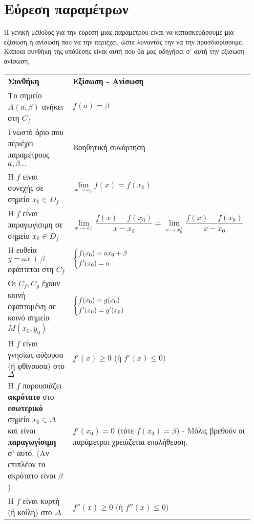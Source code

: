 \documentclass[ektypwsh]{frontisthrio}
\begin{document}
\section{Εύρεση παραμέτρων}
Η γενική μέθοδος για την εύρεση μιας παραμέτρου είναι να κατασκευάσουμε μια εξίσωση ή ανίσωση που να την περιέχει, ώστε λύνοντάς την να την προσδιορίσουμε. Κάποια συνθήκη της υπόθεσης είναι αυτή που θα μας οδηγήσει σ' αυτή την εξίσωση-ανίσωση. 
\begin{center}
\begin{tabular}{p{7.5cm}|p{7.5cm}}
\hline
\rule[-2ex]{0pt}{5.5ex} \textbf{Συνθήκη} & \textbf{Εξίσωση - Ανίσωση} \\
\hhline{==}
\rule[-2ex]{0pt}{5.5ex} Το σημείο $ A(a,\beta) $  ανήκει στη $ C_f $ & $ f(a)=\beta $ \\
\hline
\rule[-2ex]{0pt}{5.5ex} Γνωστό όριο που περιέχει παραμέτρους $ a,\beta\ldots $ & Βοηθητική συνάρτηση \\
\hline
\rule[-2ex]{0pt}{5.5ex} Η $ f $ είναι συνεχής σε σημείο $ x_0\in D_f $ & $ \lim\limits_{x\to x_0}f(x)=f(x_0) $ \\
\hline
\rule[-1ex]{0pt}{5.5ex} Η $ f $ είναι παραγωγίσιμη σε σημείο $ x_0\in D_f $ & $ \lim\limits_{x\to x_0^-}{\dfrac{f(x)-f(x_0)}{x-x_0}}=\lim\limits_{x\to x_0^+}{\dfrac{f(x)-f(x_0)}{x-x_0}} $ \\
\hline
\rule[0ex]{0pt}{5ex} Η ευθεία $ y=ax+\beta $ εφάπτεται στη $ C_f $ & $\begin{dcases}
f(x_0)=ax_0+\beta\\
f'(x_0)=a
\end{dcases} $ \\
\hline
\rule[0ex]{0pt}{5.5ex} Οι $ C_f,C_g $ έχουν κοινή εφαπτομένη σε κοινό σημείο $ M(x_0,y_0) $ & $ \begin{dcases}
f(x_0)=g(x_0)\\f'(x_0)=g'(x_0)
\end{dcases} $ \\
\hline
\rule[-2ex]{0pt}{5.5ex} Η $ f $ είναι γνησίως αύξουσα (ή φθίνουσα) στο $ \Delta $ & $ f'(x)\geq 0 $ (ή $ f'(x)\leq 0 $) \\
\hline
\rule[-2ex]{0pt}{5.5ex} Η $ f $ παρουσιάζει \textbf{ακρότατο} στο \textbf{εσωτερικό} σημείο $ x_0\in\Delta $ και είναι \textbf{παραγωγίσιμη} σ' αυτό. (Αν επιπλέον το ακρότατο είναι $ \beta $) & $ f'(x_0)=0 $ (τότε $ f(x_0)=\beta $) - Μόλις βρεθούν οι παράμετροι χρειάζεται επαλήθευση.\\
\hline
\rule[-2ex]{0pt}{5.5ex} Η $ f $ είναι κυρτή (ή κοίλη) στο $ \Delta $  & $ f''(x)\geq 0 $ (ή $ f''(x)\leq 0 $) \\

\end{tabular}
\end{center}
\end{document}

